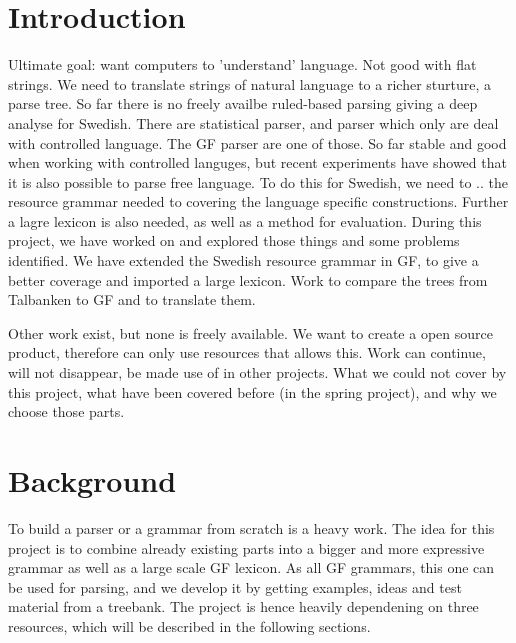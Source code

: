 \documentclass{report}
\begin{document}
\section{Introduction} 
Ultimate goal: want computers to 'understand' language. Not good with flat strings.
We need to translate strings of natural language to a richer sturture,
a parse tree. So far there is no
freely availbe ruled-based parsing giving a deep analyse for Swedish.
There are statistical parser, and parser which only are deal with controlled language.
The GF parser are one of those. 
So far stable and good when working with controlled languges, but recent experiments
have showed that it is also possible to parse free language.
To do this for Swedish, we need to  .. the resource grammar needed to covering
the language specific constructions. Further a lagre lexicon is also needed, as well
as a method for evaluation.
During this project, we have worked on and explored those things and some problems identified.
We have extended the Swedish resource grammar in GF, to give a better coverage and imported
a large lexicon. Work to compare the trees from Talbanken to GF and to translate them.



Other work exist, but none is freely available. We want to create a open source
product, therefore can only use resources that allows this. Work can continue,
will not disappear, be made use of in other projects.
What we could not cover by this project, what have been covered before (in
the spring project), and why we choose those parts.

\section{Background}  
To build a parser or a grammar from scratch is a heavy work. The idea for this
project is to combine already existing parts into a bigger and more expressive grammar
as well as a large scale GF lexicon.
As all GF grammars, this one can be used for parsing, and we develop it by getting
examples, ideas and test material from a treebank.
The project is hence heavily dependening on three resources, which will be described
in the following sections.
\end{document}
